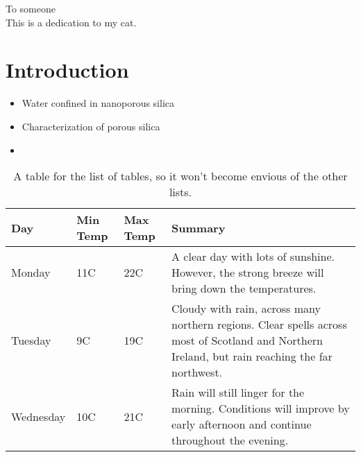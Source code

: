 \documentclass[twoside,english,a4paper]{uiofysmaster}
\begin{document}

\cleardoublepage

\begin{abstract}
\lipsum
\end{abstract}

\begin{dedication}
  To someone
  \\\vspace{12pt}
  This is a dedication to my cat.
\end{dedication}

\begin{acknowledgements}
  \lipsum
\end{acknowledgements}

\tableofcontents

\listoffigures
\listoftables
\listoflistings


\part{Introduction}
\begin{itemize}
    \item Water confined in nanoporous silica
    \item Characterization of porous silica
    \item 
\end{itemize}

\begin{center}
\begin{table}
    \begin{tabular}{ | l | l | l | p{5cm} |}
    \hline
    Day & Min Temp & Max Temp & Summary \\ \hline
    Monday & 11C & 22C & A clear day with lots of sunshine.  
    However, the strong breeze will bring down the temperatures. \\ \hline
    Tuesday & 9C & 19C & Cloudy with rain, across many northern regions. Clear spells
    across most of Scotland and Northern Ireland,
    but rain reaching the far northwest. \\ \hline
    Wednesday & 10C & 21C & Rain will still linger for the morning.
    Conditions will improve by early afternoon and continue
    throughout the evening. \\
    \hline
    \end{tabular}
\caption{A table for the list of tables, so it won't become envious of the other lists.}
\end{table}
\end{center}
\end{document}
